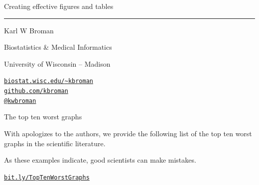 \documentclass[12pt]{article}
\newcommand{\titlesize}{\fontsize{40}{50} \selectfont}
\newcommand{\headsize}{\fontsize{35}{35} \selectfont}
\newcommand{\textsize}{\fontsize{30}{35} \selectfont}
\newcommand{\smallsize}{\fontsize{25}{30} \selectfont}
\newcommand{\smallersize}{\fontsize{20}{25} \selectfont}
\begin{document}
\thispagestyle{empty}

\begin{center}
\titlesize \color{yellow}

\vspace*{24.5mm}

{\headsize Creating effective figures and tables}

\vspace*{14.5mm}

\color{pink}
\rule{10in}{1mm}

\vspace{10mm}

\textsize \color{blue}
Karl W Broman
\vspace{5mm}

{\smallersize Biostatistics \& Medical Informatics

University of Wisconsin -- Madison
\vspace{20mm}


\href{http://www.biostat.wisc.edu/~kbroman}{\tt biostat.wisc.edu/{\textasciitilde}kbroman} \\
\href{http://github.com/kbroman}{\tt github.com/kbroman} \\
\href{https://twitter.com/kwbroman}{\tt @kwbroman}

}

\end{center}


\newpage

\headsize \color{yellow}
\hfill \begin{minipage}{5.75in}
\centering
The top ten worst graphs
\end{minipage}

\vspace{30mm}
\smallsize \color{white}

\hspace{0.5in} \begin{minipage}{9in}

\setlength{\rightskip}{0pt plus 1fil} %

With apologizes to the authors, we provide the following list of the
top ten worst graphs in the scientific literature.

\vspace{15mm}

As these examples indicate, good scientists can make mistakes.

\vspace{35mm}

\hfill \color{blue} \smallersize
\href{http://bit.ly/TopTenWorstGraphs}{\tt bit.ly/TopTenWorstGraphs}

\end{minipage}
\end{document}
